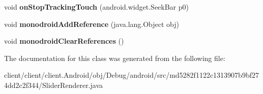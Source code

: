 \begin{DoxyCompactItemize}
\item 
\hypertarget{classmd5282f1122c1313907b9bf274dd2c2f344_1_1SliderRenderer_afb991b68048bdd0d4f2d0e0cc7cd004e}{}void {\bfseries on\+Stop\+Tracking\+Touch} (android.\+widget.\+Seek\+Bar p0)\label{classmd5282f1122c1313907b9bf274dd2c2f344_1_1SliderRenderer_afb991b68048bdd0d4f2d0e0cc7cd004e}

\item 
\hypertarget{classmd5282f1122c1313907b9bf274dd2c2f344_1_1SliderRenderer_aad4e5ab22f77ec0c6dd15893b94e44c9}{}void {\bfseries monodroid\+Add\+Reference} (java.\+lang.\+Object obj)\label{classmd5282f1122c1313907b9bf274dd2c2f344_1_1SliderRenderer_aad4e5ab22f77ec0c6dd15893b94e44c9}

\item 
\hypertarget{classmd5282f1122c1313907b9bf274dd2c2f344_1_1SliderRenderer_a12b12cd3b25d61ac4b106f4ff0bc626e}{}void {\bfseries monodroid\+Clear\+References} ()\label{classmd5282f1122c1313907b9bf274dd2c2f344_1_1SliderRenderer_a12b12cd3b25d61ac4b106f4ff0bc626e}

\end{DoxyCompactItemize}


The documentation for this class was generated from the following file\+:\begin{DoxyCompactItemize}
\item 
client/client/client.\+Android/obj/\+Debug/android/src/md5282f1122c1313907b9bf274dd2c2f344/Slider\+Renderer.\+java\end{DoxyCompactItemize}
